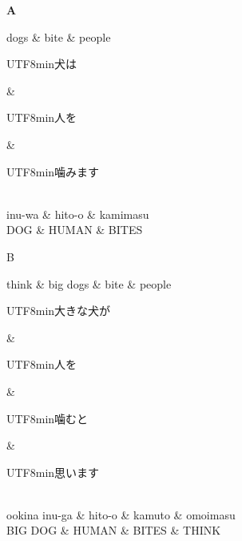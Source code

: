 \documentclass[11pt,a4paper]{article}
\newcommand{\japanese}[1]{\begin{CJK}{UTF8}{min}#1\end{CJK}}
\begin{document}
\begin{figure}
\textbf{A}
\begin{dependency}[theme = simple]
   \begin{deptext}[column sep=1em]
          dogs \& bite \& people  \\
   \end{deptext}
\end{dependency}
\begin{dependency}[theme = simple]
   \begin{deptext}[column sep=1em]
   \japanese{犬は} \& \japanese{人を} \& \japanese{噛みます}\\ 
   inu-wa \& hito-o \& kamimasu \\
          DOG \& HUMAN \& BITES  \\
   \end{deptext}
\end{dependency}

B
\begin{dependency}[theme = simple]
   \begin{deptext}[column sep=1em]
       think \& big dogs \& bite \& people  \\
   \end{deptext}
\end{dependency}
\begin{dependency}[theme = simple]
   \begin{deptext}[column sep=1em]
   \japanese{大きな犬が} \& \japanese{人を} \& \japanese{噛むと} \& \japanese{思います}\\ 
   ookina inu-ga \& hito-o \& kamuto \& omoimasu \\
         BIG DOG \& HUMAN \& BITES \& THINK \\
   \end{deptext}
\end{dependency}


\end{figure}
\end{document}
